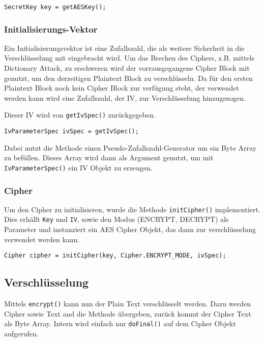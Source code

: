 \documentclass[12pt]{article}
\begin{document}
\begin{lstlisting}
SecretKey key = getAESKey();
\end{lstlisting}

\subsubsection{Initialisierungs-Vektor}
Ein Initialisierungsvektor ist eine Zufallszahl, die als weitere Sicherheit in
die Verschlüsselung mit eingebracht wird. Um das Brechen des Ciphers,
z.B. mittels Dictionary Attack, zu
erschweren wird der vorrausgegangene Cipher Block mit genutzt, um den derzeitigen
Plaintext Block zu verschlüsseln. Da für den ersten Plaintext Block noch kein
Cipher Block zur verfügung steht, der verwendet werden kann wird eine
Zufallszahl, der IV, zur Verschlüsselung hinzugezogen.

Dieser IV wird von \texttt{getIvSpec()} zurückgegeben. 

\begin{lstlisting}
IvParameterSpec ivSpec = getIvSpec();
\end{lstlisting}

Dabei nutzt die Methode
einen Pseudo-Zufallszahl-Generator um ein Byte Array zu befüllen. Dieses Array
wird dann als Argument genutzt, um mit \texttt{IvParameterSpec()} ein IV Objekt
zu erzeugen.

\subsubsection{Cipher}
Um den Cipher zu initialisieren, wurde die Methode \texttt{initCipher()}
implementiert. Dies erhällt \texttt{Key} und \texttt{IV}, sowie den Modus
(ENCRYPT, DECRYPT) als Parameter und instanziert ein AES Cipher Objekt, das dann zur
verschlüsselung verwendet werden kann.

\begin{lstlisting}
Cipher cipher = initCipher(key, Cipher.ENCRYPT_MODE, ivSpec);
\end{lstlisting}

\subsection{Verschlüsselung}
Mittels \texttt{encrypt()} kann nun der Plain Text verschlüsselt werden. Dazu
werden Cipher sowie Text and die Methode übergeben, zurück kommt der Cipher Text
als Byte Array. Intern wird einfach nur \texttt{doFinal()} auf dem Cipher Objekt
aufgerufen.
\end{document}
